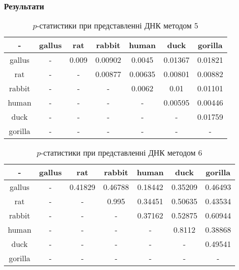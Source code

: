 \documentclass[mathserif,serif,10pt]{beamer}
\begin{document}
\begin{frame}
\frametitle{Результати}


\begin{table}[h!]
\begin{center}
\begin{tabular}{|c|c|c|c|c|c|c|}
\hline
- & gallus & rat & rabbit & human & duck & gorilla \\ \hline
gallus & - & 0.009 & 0.00902 & 0.0045 & 0.01367 & 0.01821 \\ \hline
rat & - & - & 0.00877 & 0.00635 & 0.00801 & 0.00882 \\ \hline
rabbit & - & - & - & 0.0062 & 0.01 & 0.01101 \\ \hline
human & - & - & - & - & 0.00595 & 0.00446 \\ \hline
duck & - & - & - & - & - & 0.01759 \\ \hline
gorilla & - & - & - & - & - & - \\ \hline
\end{tabular}
\end{center}
\caption{$p$-статистики при представленні ДНК методом 5}
\label{table:res5}
\end{table}

\begin{table}[h!]
\begin{center}
\begin{tabular}{|c|c|c|c|c|c|c|}
\hline
- & gallus & rat & rabbit & human & duck & gorilla \\ \hline
gallus & - & 0.41829 & 0.46788 & 0.18442 & 0.35209 & 0.46493 \\ \hline
rat & - & - & 0.995 & 0.34451 & 0.50635 & 0.43534 \\ \hline
rabbit & - & - & - & 0.37162 & 0.52875 & 0.60944 \\ \hline
human & - & - & - & - & 0.8112 & 0.38868 \\ \hline
duck & - & - & - & - & - & 0.49541 \\ \hline
gorilla & - & - & - & - & - & - \\ \hline
\end{tabular}
\end{center}
\caption{$p$-статистики при представленні ДНК методом 6}
\label{table:res6}
\end{table}

\end{frame}
\end{document}
